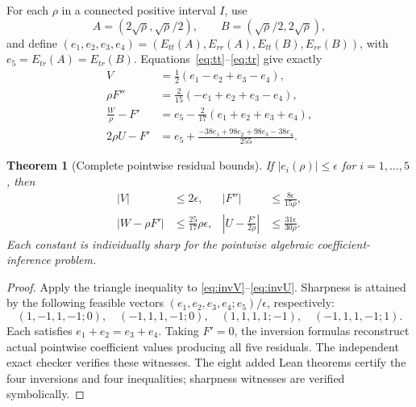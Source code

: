 \documentclass[11pt]{article}
\newtheorem{theorem}{Theorem}[section]
\begin{document}
For each $\rho$ in a connected positive interval $I$, use
\[
A=(2\sqrt\rho,\sqrt\rho/2),\qquad B=(\sqrt\rho/2,2\sqrt\rho),
\]
and define $(e_1,e_2,e_3,e_4)=(E_{tt}(A),E_{rr}(A),E_{tt}(B),E_{rr}(B))$, with $e_5=E_{tr}(A)=E_{tr}(B)$. Equations~\eqref{eq:tt}--\eqref{eq:tr} give exactly
\begin{align}
V&=\tfrac12(e_1-e_2+e_3-e_4),\label{eq:invV}\\
\rho F''&=\tfrac2{15}(-e_1+e_2+e_3-e_4),\label{eq:invF}\\
\frac W\rho-F'&=e_5-\tfrac2{17}(e_1+e_2+e_3+e_4),\label{eq:invW}\\
2\rho U-F'&=e_5+\frac{-38e_1+98e_2+98e_3-38e_4}{255}.\label{eq:invU}
\end{align}

\begin{theorem}[Complete pointwise residual bounds]
If $|e_i(\rho)|\le\epsilon$ for $i=1,\ldots,5$, then
\begin{align}
|V|&\le2\epsilon,& |F''|&\le\frac{8\epsilon}{15\rho},\label{eq:boundVF}\\
|W-\rho F'|&\le\frac{25}{17}\rho\epsilon,&
\left|U-\frac{F'}{2\rho}\right|&\le\frac{31\epsilon}{30\rho}.\label{eq:boundUW}
\end{align}
Each constant is individually sharp for the pointwise algebraic coefficient-inference problem.
\end{theorem}
\begin{proof}
Apply the triangle inequality to \eqref{eq:invV}--\eqref{eq:invU}. Sharpness is attained by the following feasible vectors $(e_1,e_2,e_3,e_4;e_5)/\epsilon$, respectively:
\[
(1,-1,1,-1;0),\quad(-1,1,1,-1;0),\quad
(1,1,1,1;-1),\quad(-1,1,1,-1;1).
\]
Each satisfies $e_1+e_2=e_3+e_4$. Taking $F'=0$, the inversion formulas reconstruct actual pointwise coefficient values producing all five residuals. The independent exact checker verifies these witnesses. The eight added Lean theorems certify the four inversions and four inequalities; sharpness witnesses are verified symbolically.
\end{proof}
\end{document}
